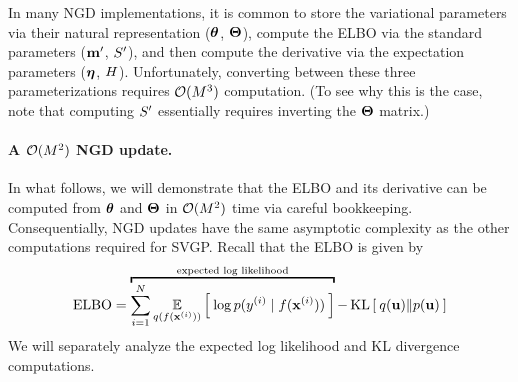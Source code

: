 In many NGD implementations, it is common to store the variational parameters via their natural representation ($\boldsymbol{\theta}$, $\boldsymbol{\Theta}$), compute the ELBO via the standard parameters ($\mathbf{m}'$, $S'$), and then compute the derivative via the expectation parameters ($\boldsymbol{\eta}$, $H$).
Unfortunately, converting between these three parameterizations requires $\bigo{M^3}$ computation.
(To see why this is the case, note that computing $S'$ essentially requires inverting the $\boldsymbol{\Theta}$ matrix.)

\paragraph{A $\bigo{M^2}$ NGD update.}
In what follows, we will demonstrate that the ELBO and its derivative can be computed from $\boldsymbol{\theta}$ and $\boldsymbol{\Theta}$ in $\bigo{M^2}$ time via careful bookkeeping.
Consequentially, NGD updates have the same asymptotic complexity as the other computations required for SVGP.
Recall that the ELBO is given by
\[
  \text{ELBO} = \overbracket{ \sum_{i=1}^N \Evover{q(f(\bx^{(i)}))}{  \: \log p( y^{(i)} \mid f(\bx^{(i)}) ) \: }}^{\text{expected log likelihood}} - \kl{ q(\bu) }{ p(\bu) }
\]
We will separately analyze the expected log likelihood and KL divergence computations.

